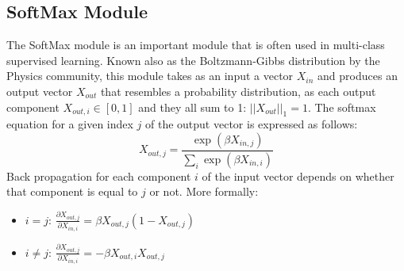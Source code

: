 \subsection{SoftMax Module}

The SoftMax module is an important module that is often used in multi-class supervised learning.
Known also as the Boltzmann-Gibbs distribution by the Physics community, this module takes as an input a vector $X_{in}$ and produces an output vector $X_{out}$ that resembles a probability distribution, as each output component $X_{out, i} \in [0, 1]$ and they all sum to 1: $||X_{out}||_1 = 1$.
The softmax equation for a given index $j$ of the output vector is expressed as follows: $$X_{out, j} = \frac{\exp(\beta X_{in, j})}{\sum_i{\exp(\beta X_{in, i})}}$$ Back propagation for each component $i$ of the input vector depends on whether that component is equal to $j$ or not.
More formally:
\begin{itemize}
    \item $i = j$: $\frac{\partial X_{out, j}}{\partial X_{in, i}} = \beta X_{out, j}(1 - X_{out, j})$
    \item $i \neq j$: $\frac{\partial X_{out, j}}{\partial X_{in, i}} = -\beta X_{out, i}X_{out, j}$ 
\end{itemize}